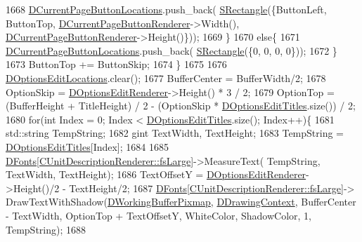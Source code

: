 \begin{DoxyCode}
1668             \hyperlink{classCApplicationData_a3615df8e23cea3ce17f11cf61340a7b4}{DCurrentPageButtonLocations}.push\_back( 
      \hyperlink{structSRectangle}{SRectangle}(\{ButtonLeft, ButtonTop, \hyperlink{classCApplicationData_abfe1743f2634b069ccc811db4a8733a8}{DCurrentPageButtonRenderer}->Width(),
       \hyperlink{classCApplicationData_abfe1743f2634b069ccc811db4a8733a8}{DCurrentPageButtonRenderer}->Height()\}));
1669         \}
1670         \textcolor{keywordflow}{else}\{
1671             \hyperlink{classCApplicationData_a3615df8e23cea3ce17f11cf61340a7b4}{DCurrentPageButtonLocations}.push\_back( 
      \hyperlink{structSRectangle}{SRectangle}(\{0, 0, 0, 0\}));
1672         \}
1673         ButtonTop += ButtonSkip;
1674     \}
1675     
1676     \hyperlink{classCApplicationData_ab4e6804c6e50cca45ab3c3071588da34}{DOptionsEditLocations}.clear();
1677     BufferCenter = BufferWidth/2;
1678     OptionSkip = \hyperlink{classCApplicationData_ad445b9a4d742414d09196de7cd8a5b26}{DOptionsEditRenderer}->Height() * 3 / 2;
1679     OptionTop = (BufferHeight + TitleHeight) / 2 - (OptionSkip * 
      \hyperlink{classCApplicationData_a7a322ef6b8c1db3e995c6b493230fd05}{DOptionsEditTitles}.size()) / 2;
1680     \textcolor{keywordflow}{for}(\textcolor{keywordtype}{int} Index = 0; Index < \hyperlink{classCApplicationData_a7a322ef6b8c1db3e995c6b493230fd05}{DOptionsEditTitles}.size(); Index++)\{
1681         std::string TempString;
1682         gint TextWidth, TextHeight;
1683         TempString = \hyperlink{classCApplicationData_a7a322ef6b8c1db3e995c6b493230fd05}{DOptionsEditTitles}[Index];
1684         
1685         \hyperlink{classCApplicationData_afde9247d0a3ea87393ec86dcdb1e8274}{DFonts}[\hyperlink{classCUnitDescriptionRenderer_a3ea4cd83b6dd9533ab3abb953a7da35aaf467097fe4f4811a5e2f1959c86e071d}{CUnitDescriptionRenderer::fsLarge}]->MeasureText(
      TempString, TextWidth, TextHeight);
1686         TextOffsetY = \hyperlink{classCApplicationData_ad445b9a4d742414d09196de7cd8a5b26}{DOptionsEditRenderer}->Height()/2 - TextHeight/2;
1687         \hyperlink{classCApplicationData_afde9247d0a3ea87393ec86dcdb1e8274}{DFonts}[\hyperlink{classCUnitDescriptionRenderer_a3ea4cd83b6dd9533ab3abb953a7da35aaf467097fe4f4811a5e2f1959c86e071d}{CUnitDescriptionRenderer::fsLarge}]->
      DrawTextWithShadow(\hyperlink{classCApplicationData_afa34cf2780f38dd28c0c811e69d60a97}{DWorkingBufferPixmap}, \hyperlink{classCApplicationData_aa6c5bea9bdcc64398e5a3f693661d37c}{DDrawingContext}, BufferCenter - TextWidth, 
      OptionTop + TextOffsetY, WhiteColor, ShadowColor, 1, TempString);
1688         

\end{DoxyCode}
